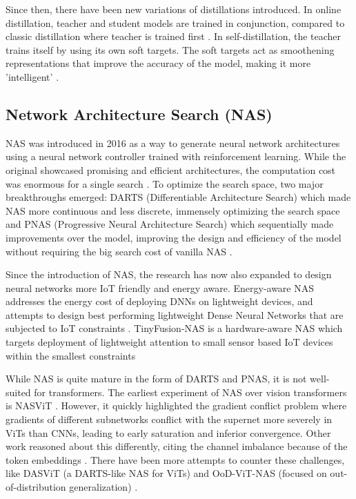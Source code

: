 \documentclass[conference]{IEEEtran}
\begin{document}
	Since then, there have been new variations of distillations introduced. In online distillation, teacher and student models are trained in conjunction, compared to classic distillation where teacher is trained first \cite{deepmutuallearning2018}. In self-distillation, the teacher trains itself by using its own soft targets. The soft targets act as smoothening representations that improve the accuracy of the model, making it more 'intelligent' \cite{selfdistilliation2019}. 
	
	\subsection{Network Architecture Search (NAS)}
	NAS was introduced in 2016 as a way to generate neural network architectures using a neural network controller trained with reinforcement learning. While the original showcased promising and efficient architectures, the computation cost was enormous for a single search \cite{nasrl2017}. To optimize the search space, two major breakthroughs emerged: DARTS (Differentiable Architecture Search) which made NAS more continuous and less discrete, immensely optimizing the search space \cite{darts2019} and PNAS (Progressive Neural Architecture Search) which sequentially made improvements over the model, improving the design and efficiency of the model without requiring the big search cost of vanilla NAS \cite{pnas2018}.
	
	Since the introduction of NAS, the research has now also expanded to design neural networks more IoT friendly and energy aware. Energy-aware NAS addresses the energy cost of deploying DNNs on lightweight devices, and attempts to design best performing lightweight Dense Neural Networks that are subjected to IoT constraints \cite{energyawarenas2024}. TinyFusion-NAS is a hardware-aware NAS which targets deployment of lightweight attention to small sensor based IoT devices within the smallest constraints \cite{tinyfusionnas2026}
	
	While NAS is quite mature in the form of DARTS and PNAS, it is not well-suited for transformers. The earliest experiment of NAS over vision transformers is NASViT \cite{nasvit2022}. However, it quickly highlighted the gradient conflict problem where gradients of different subnetworks conflict with the supernet more severely in ViTs than CNNs, leading to early saturation and inferior convergence. Other work reasoned about this differently, citing the channel imbalance because of the token embeddings \cite{vitas2021}. There have been more attempts to counter these challenges, like DASViT (a DARTS-like NAS for ViTs) \cite{dasvit2025} and OoD-ViT-NAS (focused on out-of-distribution generalization) \cite{oodvitnas2024}.
	
\end{document}
